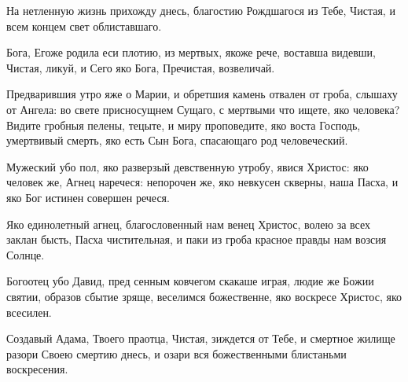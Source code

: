 \begin{mymulticols}


На нетленную жизнь прихожду днесь, благостию Рождшагося из Тебе, Чистая, и всем концем свет облиставшаго. 


Бога, Егоже родила еси плотию, из мертвых, якоже рече, воставша видевши, Чистая, ликуй, и Сего яко Бога, Пречистая, возвеличай. 


Предварившия утро яже о Марии, и обретшия камень отвален от гроба, слышаху от Ангела: во свете присносущнем Сущаго, с мертвыми что ищете, яко человека? Видите гробныя пелены, тецыте, и миру проповедите, яко воста Господь, умертвивый смерть, яко есть Сын Бога, спасающаго род человеческий.




Мужеский убо пол, яко разверзый девственную утробу, явися Христос: яко человек же, Агнец наречеся: непорочен же, яко невкусен скверны, наша Пасха, и яко Бог истинен совершен речеся. 


Яко единолетный агнец, благословенный нам венец Христос, волею за всех заклан бысть, Пасха чистительная, и паки из гроба красное правды нам возсия Солнце. 


Богоотец убо Давид, пред сенным ковчегом скакаше играя, людие же Божии святии, образов сбытие зряще, веселимся божественне, яко воскресе Христос, яко всесилен. 



Создавый Адама, Твоего праотца, Чистая, зиждется от Тебе, и смертное жилище разори Своею смертию днесь, и озари вся божественными блистаньми воскресения. 



\end{mymulticols}

